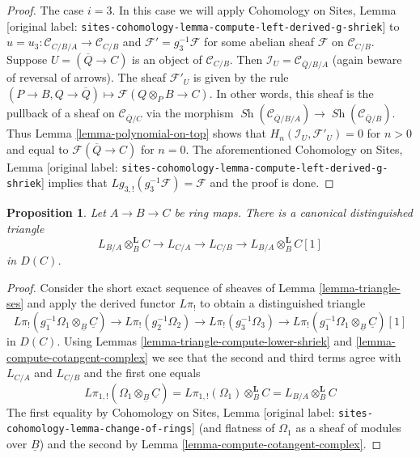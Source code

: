 \documentclass[10pt,a4paper]{article}
\theoremstyle{plain}
\newtheorem{proposition}[subsection]{Proposition}
\theoremstyle{definition}
\theoremstyle{remark}
\numberwithin{equation}{subsection}
\def\Sh{\mathop{\mathit{Sh}}\nolimits}
\begin{document}
\begin{proof}
\medskip\noindent
The case $i = 3$. In this case we will apply
Cohomology on Sites, Lemma
\textnormal{[original label: \nolinkurl{sites-cohomology-lemma-compute-left-derived-g-shriek}]}
to $u = u_3 : \mathcal{C}_{C/B/A} \to \mathcal{C}_{C/B}$
and $\mathcal{F}' = g_3^{-1}\mathcal{F}$ for some abelian sheaf
$\mathcal{F}$ on $\mathcal{C}_{C/B}$.
Suppose $U = (\overline{Q} \to C)$ is an object of $\mathcal{C}_{C/B}$.
Then $\mathcal{I}_U = \mathcal{C}_{\overline{Q}/B/A}$ (again beware
of reversal of arrows). The sheaf $\mathcal{F}'_U$ is given by the
rule $(P \to B, Q \to \overline{Q}) \mapsto \mathcal{F}(Q \otimes_P B \to C)$.
In other words, this sheaf is the pullback of a sheaf
on $\mathcal{C}_{\overline{Q}/C}$ via the morphism
$\Sh(\mathcal{C}_{\overline{Q}/B/A}) \to \Sh(\mathcal{C}_{\overline{Q}/B})$.
Thus Lemma \ref{lemma-polynomial-on-top} shows that
$H_n(\mathcal{I}_U, \mathcal{F}'_U) = 0$ for $n > 0$
and equal to $\mathcal{F}(\overline{Q} \to C)$ for $n = 0$.
The aforementioned Cohomology on Sites, Lemma
\textnormal{[original label: \nolinkurl{sites-cohomology-lemma-compute-left-derived-g-shriek}]}
implies that $Lg_{3, !}(g_3^{-1}\mathcal{F}) = \mathcal{F}$ and
the proof is done.
\end{proof}

\begin{proposition}
\label{proposition-triangle}
Let $A \to B \to C$ be ring maps. There is a canonical distinguished
triangle
$$
L_{B/A} \otimes_B^\mathbf{L} C \to L_{C/A} \to L_{C/B} \to
L_{B/A} \otimes_B^\mathbf{L} C[1]
$$
in $D(C)$.
\end{proposition}

\begin{proof}
Consider the short exact sequence of sheaves of
Lemma \ref{lemma-triangle-ses}
and apply the derived functor $L\pi_!$ to obtain a distinguished
triangle
$$
L\pi_!(g_1^{-1}\Omega_1 \otimes_{\underline{B}} \underline{C}) \to
L\pi_!(g_2^{-1}\Omega_2) \to
L\pi_!(g_3^{-1}\Omega_3) \to
L\pi_!(g_1^{-1}\Omega_1 \otimes_{\underline{B}} \underline{C})[1]
$$
in $D(C)$. Using Lemmas \ref{lemma-triangle-compute-lower-shriek} and
\ref{lemma-compute-cotangent-complex}
we see that the second and third terms agree with $L_{C/A}$ and $L_{C/B}$
and the first one equals
$$
L\pi_{1, !}(\Omega_1 \otimes_{\underline{B}} \underline{C}) =
L\pi_{1, !}(\Omega_1) \otimes_B^\mathbf{L} C =
L_{B/A} \otimes_B^\mathbf{L} C
$$
The first equality by Cohomology on Sites, Lemma
\textnormal{[original label: \nolinkurl{sites-cohomology-lemma-change-of-rings}]}
(and flatness of $\Omega_1$ as a sheaf of modules over $\underline{B}$)
and the second by Lemma \ref{lemma-compute-cotangent-complex}.
\end{proof}
\end{document}
